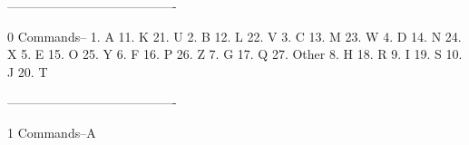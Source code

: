  
 
 
 
 
 
 
 
 
 
 
 
 
 
 
 
 
 
 
 
 
 
 
 
 
 
 
 
 
 
 
 
 
 
 
 
 
 
 
 
 
 
 
 
 
 
 
 
 
 
 
 
 
 
 
 
 
 
 
 
 
 
 
 
 
 
 
 
 
 
 
 
 
 
 
 
 
 
 
 
----------------------------------------
 
0
Commands--
   1. A      11. K      21. U
   2. B      12. L      22. V
   3. C      13. M      23. W
   4. D      14. N      24. X
   5. E      15. O      25. Y
   6. F      16. P      26. Z
   7. G      17. Q      27. Other
   8. H      18. R
   9. I      19. S
  10. J      20. T
 
----------------------------------------
 
1
Commands--A
 
